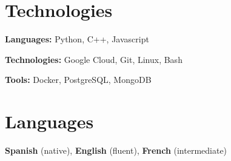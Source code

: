 \section{Technologies}
    
\begin{onecolentry}
    \textbf{Languages:} Python, C++, Javascript
\end{onecolentry}

\vspace{0.2 cm}

\begin{onecolentry}
    \textbf{Technologies:} Google Cloud, Git, Linux, Bash
\end{onecolentry}

\vspace{0.2 cm}

\begin{onecolentry}
    \textbf{Tools:} Docker, PostgreSQL, MongoDB
\end{onecolentry}

\section{Languages}
\begin{onecolentry}
    \textbf{Spanish} (native), \textbf{English} (fluent), \textbf{French} (intermediate)
\end{onecolentry} 